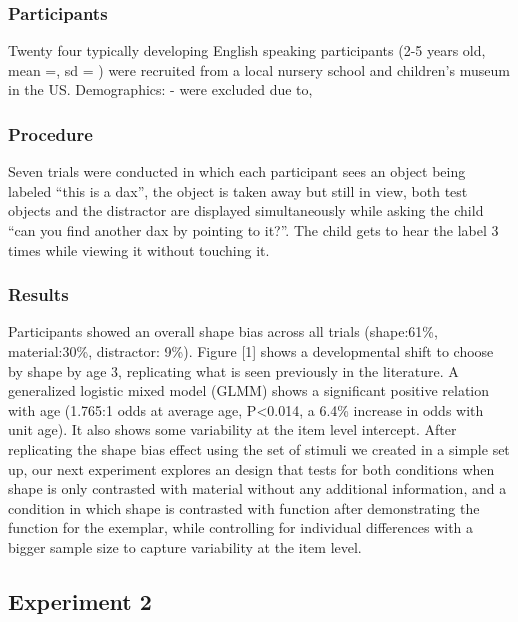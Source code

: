 \documentclass[10pt, letterpaper]{article}
\begin{document}
\hypertarget{participants}{%
\subsubsection{Participants}\label{participants}}

Twenty four typically developing English speaking participants (2-5
years old, mean =, sd = ) were recruited from a local nursery school and
children's museum in the US. Demographics: - were excluded due to,

\hypertarget{procedure}{%
\subsubsection{Procedure}\label{procedure}}

Seven trials were conducted in which each participant sees an object
being labeled ``this is a dax'', the object is taken away but still in
view, both test objects and the distractor are displayed simultaneously
while asking the child ``can you find another dax by pointing to it?''.
The child gets to hear the label 3 times while viewing it without
touching it.

\hypertarget{results}{%
\subsubsection{Results}\label{results}}

Participants showed an overall shape bias across all trials (shape:61\%,
material:30\%, distractor: 9\%). Figure {[}1{]} shows a developmental
shift to choose by shape by age 3, replicating what is seen previously
in the literature. A generalized logistic mixed model (GLMM) shows a
significant positive relation with age (1.765:1 odds at average age,
P\textless0.014, a 6.4\% increase in odds with unit age). It also shows
some variability at the item level intercept. After replicating the
shape bias effect using the set of stimuli we created in a simple set
up, our next experiment explores an design that tests for both
conditions when shape is only contrasted with material without any
additional information, and a condition in which shape is contrasted
with function after demonstrating the function for the exemplar, while
controlling for individual differences with a bigger sample size to
capture variability at the item level.

\hypertarget{experiment-2}{%
\subsection{Experiment 2}\label{experiment-2}}
\end{document}
